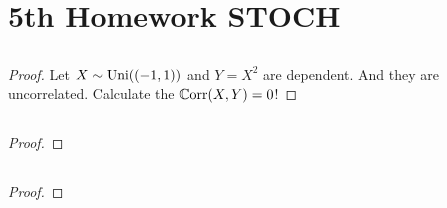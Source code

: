 
\section{5th Homework STOCH}
\subsection{}
\begin{proof}
	Let $X \sim \operatorname{Uni}((-1,1))$ and $Y = X^2$ are dependent. And they are uncorrelated.
	Calculate the $\mathbb{C}\text{orr}(X,Y) = 0$!
\end{proof}

\subsection{}
\begin{proof}
	
\end{proof}
\subsection{}
\begin{proof}
	
\end{proof}
